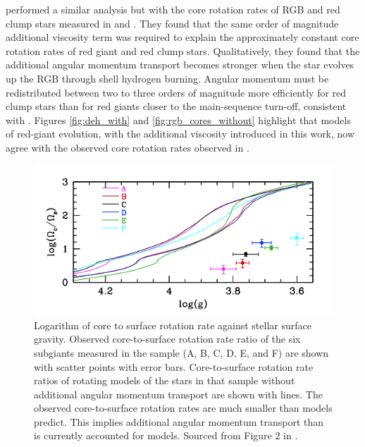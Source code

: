 \citet{moyano_asteroseismology_2022} performed a similar analysis but with the core rotation rates of RGB and red clump stars measured in \citet{mosser_spin_2012} and \citet{gehan_core_2018}.
They found that the same order of magnitude additional viscosity term was required to explain the approximately constant core rotation rates of red giant and red clump stars.  
Qualitatively, they found that the additional angular momentum transport becomes stronger when the star evolves up the RGB through shell hydrogen burning.
Angular momentum must be redistributed between two to three orders of
magnitude more efficiently for red clump stars than for red giants closer to the main-sequence turn-off, consistent with \citet{den_hartogh_constraining_2019}.
Figures \ref{fig:deh_with} and \ref{fig:rgb_cores_without}  highlight that models of red-giant evolution, with the additional viscosity introduced in this work, now agree with the observed core rotation rates observed in \citet{gehan_core_2018}.

\begin{figure}[h]
    \includegraphics[width=\textwidth]{Figures/intro_figures/deheuvels_disparity_without.png}
    \caption[A comparison of modelled and observed core to surface rotation rate ratios of post-main-sequence stars without additional angular momentum transport.]{Logarithm of core to surface rotation rate against stellar surface gravity. Observed core-to-surface rotation rate ratio of the six subgiants measured in the \citet{deheuvels_seismic_2014} sample (A, B, C, D, E, and F) are shown with scatter points with error bars.
    Core-to-surface rotation rate ratios of rotating models of the stars in that sample without additional angular momentum transport \citep{eggenberger_asteroseismology_2019} are shown with lines.
    The observed core-to-surface rotation rates are much smaller than models predict. This implies additional angular momentum transport than is currently accounted for models.
    Sourced from Figure 2 in \citet{eggenberger_asteroseismology_2019}.}
    \label{fig:deh_without}
\end{figure}

